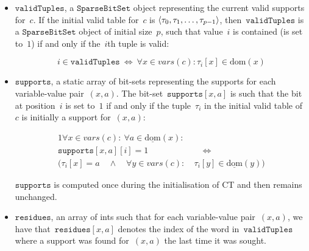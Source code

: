 \documentclass[a4paper,11pt]{article}
\newcommand{\Dom}[1]{\text{dom}({#1})}
\newcommand{\Dominit}[1]{\underline{\text{dom}}(#1)}
\newcommand{\SparseBitSet}{\texttt{SparseBitSet}}
\newcommand{\CurrTable}{\texttt{validTuples}}
\newcommand{\Supports}{\texttt{supports}}
\newcommand{\Residues}{\texttt{residues}}
\numberwithin{equation}{section}
\begin{document}
\begin{itemize}
  
  \item $\CurrTable$, a $\SparseBitSet$ object representing the current valid
    supports for~$c$. If the initial valid table for~$c$
    is $\left\langle\tau_0, \tau_1, \ldots, \tau_{p-1}\right\rangle$,
    then~$\CurrTable$ is a 
    $\SparseBitSet$ object of initial size~$p$, such that value~$i$
    is contained (is set to~$1$) if and only if the~$i$th tuple is valid:
    
    \begin{equation} \label{eq:currtable}
      i \in \CurrTable \ \Leftrightarrow \ \forall x \in \mathit{vars}(c): \tau_i[x] \in \Dom{x}
    \end{equation}

  \item $\Supports$, a static array of bit-sets representing
    the supports for each variable-value pair~$(x,a)$.
    The bit-set~$\Supports[x,a]$ is such that
    the bit at position~$i$ is set to~$1$ if and only if the 
    tuple~$\tau_i$ in the initial valid table of~$c$ is initially a support for~$(x,a)$:

    \begin{alignat}{1}
      \forall x \in \mathit{vars}(c): \ \forall a \in \Dominit{x}:& \\
      \Supports[x,a][i] = 1 &\quad \Leftrightarrow \\
      (\tau_i[x] = a \quad \land \quad
      \forall y \in \mathit{vars}(c): \ &\tau_i[y] \in \Dominit{y})
    \end{alignat}

    $\Supports$ is computed once during the initialisation of CT and then
    remains unchanged.
    
  \item $\Residues$, an array of ints such that for each variable-value pair~$(x,a)$,
    we have that~$\Residues[x,a]$ denotes the index of the word in~$\CurrTable$
    where a support was found for~$(x,a)$ the last time it was sought.

\end{itemize}
\end{document}
